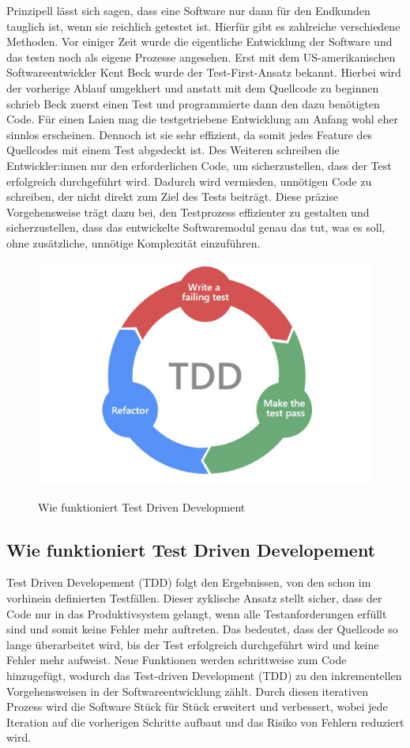 Prinzipell lässt sich sagen, dass eine Software nur dann für den Endkunden tauglich ist, wenn sie reichlich getestet ist. Hierfür gibt es zahlreiche verschiedene Methoden. Vor einiger Zeit wurde die eigentliche Entwicklung der Software und das testen noch als eigene Prozesse angesehen. Erst mit dem US-amerikanischen Softwareentwickler Kent Beck wurde der Test-First-Ansatz bekannt. Hierbei wird der vorherige Ablauf umgekhert und anstatt mit dem Quellcode zu beginnen schrieb Beck zuerst einen Test und programmierte dann den dazu benötigten Code. Für einen Laien mag die testgetriebene Entwicklung am Anfang wohl eher sinnlos erscheinen. Dennoch ist sie sehr effizient, da somit jedes Feature des Quellcodes mit einem Test abgedeckt ist. Des Weiteren schreiben die Entwickler:innen nur den erforderlichen Code, um sicherzustellen, dass der Test erfolgreich durchgeführt wird. Dadurch wird vermieden, unnötigen Code zu schreiben, der nicht direkt zum Ziel des Tests beiträgt. Diese präzise Vorgehensweise trägt dazu bei, den Testprozess effizienter zu gestalten und sicherzustellen, dass das entwickelte Softwaremodul genau das tut, was es soll, ohne zusätzliche, unnötige Komplexität einzuführen.

\begin{figure}
    \centering
    \includegraphics[width=0.5\linewidth]{pics/tdd.jpeg}
    \caption{Wie funktioniert Test Driven Development}
    \label{fig:enter-label}
    \cite{tdd_grafik}
\end{figure}

\subsection{Wie funktioniert Test Driven Developement}

Test Driven Developement (TDD) folgt den Ergebnissen, von den schon im vorhinein definierten Testfällen. Dieser zyklische Ansatz stellt sicher, dass der Code nur in das Produktivsystem gelangt, wenn alle Testanforderungen erfüllt sind und somit keine Fehler mehr auftreten. Das bedeutet, dass der Quellcode so lange überarbeitet wird, bis der Test erfolgreich durchgeführt wird und keine Fehler mehr aufweist. Neue Funktionen werden schrittweise zum Code hinzugefügt, wodurch das Test-driven Development (TDD) zu den inkrementellen Vorgehensweisen in der Softwareentwicklung zählt. Durch diesen iterativen Prozess wird die Software Stück für Stück erweitert und verbessert, wobei jede Iteration auf die vorherigen Schritte aufbaut und das Risiko von Fehlern reduziert wird.

\cite{Was_ist_TDD}

